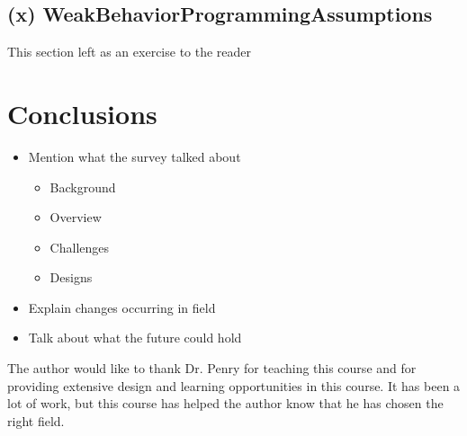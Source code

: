 \documentclass[prodmode,acmtecs]{acmsmall} %
\begin{document}
\subsection{(x) WeakBehaviorProgrammingAssumptions}
This section left as an exercise to the reader

\section{Conclusions} \label{sec:conclusions}
\begin{itemize}
\item Mention what the survey talked about
  \begin{itemize}
  \item Background
  \item Overview
  \item Challenges
  \item Designs
  \end{itemize}
\item Explain changes occurring in field
\item Talk about what the future could hold
\end{itemize}

\begin{acks}
The author would like to thank Dr. Penry for teaching this course and for
providing extensive design and learning opportunities in this course. It has
been a lot of work, but this course has helped the author know that he has
chosen the right field.
\end{acks}




\end{document}
